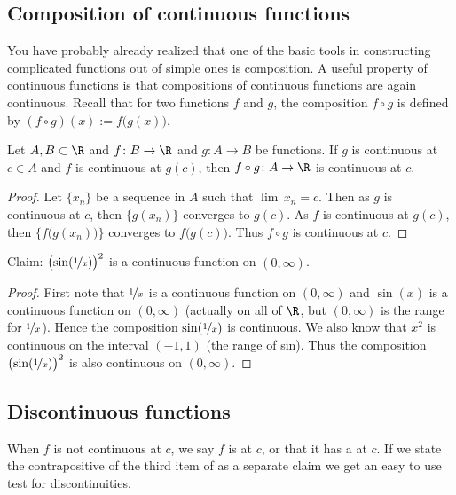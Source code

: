 \documentclass[12pt]{book}
\begin{document}
\subsection*{Composition of continuous functions}

You have probably already realized that one of the basic tools in
constructing complicated functions out of simple ones is composition.
A useful property of continuous functions is that compositions
of continuous functions are again
continuous.
Recall that for two functions $f$ and $g$,
the composition $f \circ g$ is defined by
$(f \circ g)(x) := f\bigl(g(x)\bigr)$.

\begin{prop}
Let $A, B \subset \R$ and $f \colon B \to \R$ and $g \colon A \to B$ be
functions.
If $g$ is continuous at $c \in A$ and
$f$ is continuous at $g(c)$, then $f \circ g \colon A \to \R$ is continuous
at $c$.
\end{prop}

\begin{proof}
Let $\{ x_n \}$ be a sequence in $A$ such that $\lim\, x_n = c$.
Then as $g$ is continuous at $c$, then $\{ g(x_n) \}$ converges to $g(c)$.
As $f$ is continuous at $g(c)$, then $\{ f\bigl(g(x_n)\bigr) \}$ converges
to $f\bigl(g(c)\bigr)$.
Thus $f \circ g$ is continuous at $c$.
\end{proof}

\begin{example}
Claim: ${\bigl(\sin(\nicefrac{1}{x})\bigr)}^2$ is a continuous function on $(0,\infty)$.

\begin{proof} First note that $\nicefrac{1}{x}$ is a continuous function on
$(0,\infty)$ and $\sin(x)$ is a continuous function on $(0,\infty)$ (actually
on all of $\R$, but $(0,\infty)$ is the range for $\nicefrac{1}{x}$).
Hence the composition $\sin(\nicefrac{1}{x})$ is continuous.
We also
know that $x^2$ is continuous on the interval $(-1,1)$ (the range of sin).
Thus
the composition
${\bigl(\sin(\nicefrac{1}{x})\bigr)}^2$ is also continuous on $(0,\infty)$.
\end{proof}
\end{example}

\subsection*{Discontinuous functions}

When $f$ is not continuous at $c$, we
say $f$ is \emph{} at $c$, or that it has a
\emph{} at $c$.
If we state the
contrapositive of the third item of  as
a separate claim we get an easy to use test for discontinuities.
\end{document}
